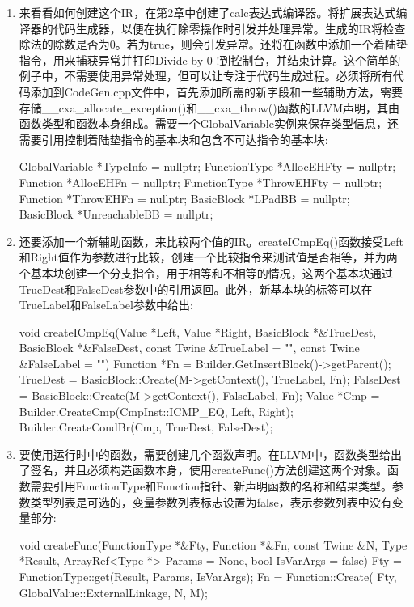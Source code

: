\begin{enumerate}
\item
来看看如何创建这个IR，在第2章中创建了calc表达式编译器。将扩展表达式编译器的代码生成器，以便在执行除零操作时引发并处理异常。生成的IR将检查除法的除数是否为0。若为true，则会引发异常。还将在函数中添加一个着陆垫指令，用来捕获异常并打印Divide by 0 !到控制台，并结束计算。这个简单的例子中，不需要使用异常处理，但可以让专注于代码生成过程。必须将所有代码添加到CodeGen.cpp文件中，首先添加所需的新字段和一些辅助方法，需要存储\_\_cxa\_allocate\_exception()和\_\_cxa\_throw()函数的LLVM声明，其由函数类型和函数本身组成。需要一个GlobalVariable实例来保存类型信息，还需要引用控制着陆垫指令的基本块和包含不可达指令的基本块:

\begin{cpp}
GlobalVariable *TypeInfo = nullptr;
FunctionType *AllocEHFty = nullptr;
Function *AllocEHFn = nullptr;
FunctionType *ThrowEHFty = nullptr;
Function *ThrowEHFn = nullptr;
BasicBlock *LPadBB = nullptr;
BasicBlock *UnreachableBB = nullptr;
\end{cpp}

\item
还要添加一个新辅助函数，来比较两个值的IR。createICmpEq()函数接受Left和Right值作为参数进行比较，创建一个比较指令来测试值是否相等，并为两个基本块创建一个分支指令，用于相等和不相等的情况，这两个基本块通过TrueDest和FalseDest参数中的引用返回。此外，新基本块的标签可以在TrueLabel和FalseLabel参数中给出:

\begin{cpp}
void createICmpEq(Value *Left, Value *Right,
                    BasicBlock *&TrueDest,
                    BasicBlock *&FalseDest,
                    const Twine &TrueLabel = "",
                    const Twine &FalseLabel = "") {
    Function *Fn =
        Builder.GetInsertBlock()->getParent();
    TrueDest = BasicBlock::Create(M->getContext(),
                                    TrueLabel, Fn);
    FalseDest = BasicBlock::Create(M->getContext(),
                                    FalseLabel, Fn);
    Value *Cmp = Builder.CreateCmp(CmpInst::ICMP_EQ,
                                    Left, Right);
    Builder.CreateCondBr(Cmp, TrueDest, FalseDest);
}
\end{cpp}

\item
要使用运行时中的函数，需要创建几个函数声明。在LLVM中，函数类型给出了签名，并且必须构造函数本身，使用createFunc()方法创建这两个对象。函数需要引用FunctionType和Function指针、新声明函数的名称和结果类型。参数类型列表是可选的，变量参数列表标志设置为false，表示参数列表中没有变量部分:

\begin{cpp}
void createFunc(FunctionType *&Fty, Function *&Fn,
                const Twine &N, Type *Result,
                ArrayRef<Type *> Params = None,
                bool IsVarArgs = false) {
    Fty = FunctionType::get(Result, Params, IsVarArgs);
    Fn = Function::Create(
        Fty, GlobalValue::ExternalLinkage, N, M);
}
\end{cpp}
\end{enumerate}

